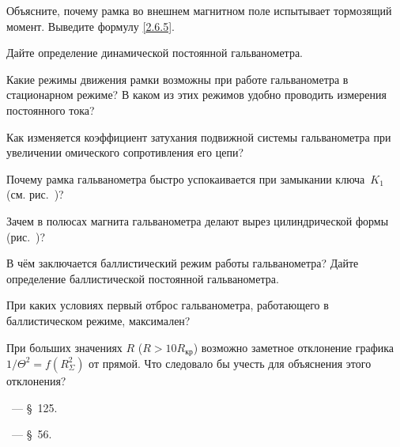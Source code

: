 \begin{lab:questions}
    \item Объясните, почему рамка во внешнем магнитном поле
    испытывает тормозящий момент. Выведите формулу \eqref{2.6.5}.
    
	\item Дайте определение динамической постоянной гальванометра. 

	\item Какие режимы движения рамки возможны при работе гальванометра в
стационарном режиме? В каком из этих режимов удобно проводить измерения
постоянного тока?

	\item Как изменяется коэффициент затухания подвижной системы гальванометра
при увеличении омического сопротивления его цепи?

	\item Почему рамка гальванометра быстро успокаивается при замыкании ключа~$K_1$ (см. рис.~)?

	\item Зачем в полюсах магнита гальванометра делают вырез цилиндрической
формы (рис.~)?

	\item В чём заключается баллистический режим работы гальванометра? Дайте
определение баллистической постоянной гальванометра.

	\item При каких условиях первый отброс гальванометра, работающего в
баллистическом режиме, максимален?

	\item При больших значениях $R$ ($R>10R_{\text{кр}}$)
возможно заметное отклонение графика $1/\Theta^2=f(R_{\Sigma}^2)$ от прямой. 
Что следовало бы учесть для объяснения этого отклонения?
\end{lab:questions}


\begin{lab:literature}
	\item \SivuhinIII~--- \S~125.

	\item \Kalashnikov~--- \S~56.
\end{lab:literature}
